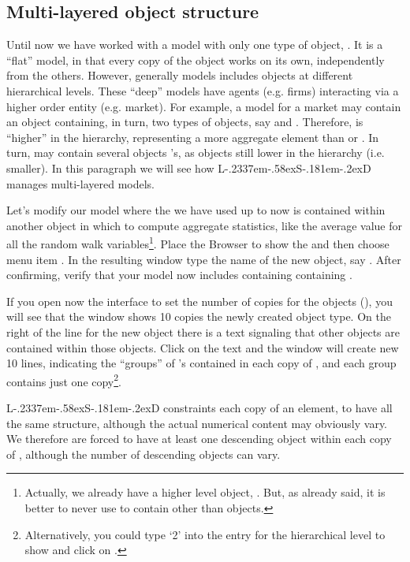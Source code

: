 \documentclass [11pt,a4paper] {book}
\def\LsD{{L\kern-.2337em\lower-.58ex\hbox{S}\kern-.181em\lower-.2ex\hbox{D}}\xspace}
\begin{document}
\subsection{Multi-layered object structure}

Until now we have worked with a model with only one type of object, . It is a
``flat'' model, in that every copy of the object works on its own, independently from the
others. However, generally models includes objects at different hierarchical levels.
These ``deep'' models have agents (e.g. firms) interacting via a higher order entity
(e.g. market). For example, a model for a market may contain an object 
containing, in turn, two types of objects, say  and . Therefore,
 is ``higher'' in the hierarchy, representing a more aggregate element than
 or . In turn,  may contain several objects
's, as objects still lower in the hierarchy (i.e. smaller). In this paragraph
we will see how \LsD manages multi-layered models.

Let's modify our model where the  we have used up to now is contained within
another object in which to compute aggregate statistics, like the average value for all
the random walk variables\footnote{Actually, we already have a higher level object,
. But, as already said, it is better to never use  to contain other
than objects.}. Place the Browser to show the  and then choose menu item
. In the resulting window type the name of the new object,
say . After confirming, verify that your model now includes
 containing  containing .

If you open now the interface to set the number of copies for the objects (), you will see that the window shows 10 copies 
the newly created  object type. On the right of the line for the new object there is a text signaling that other objects are contained within those objects. Click on the text and the window will create new 10 lines, indicating the ``groups'' of 's contained in each copy of , and each group contains just one copy\footnote{Alternatively, you could type `2' into the entry for the hierarchical level to show and click on \footnotesize.}.

\LsD constraints each copy of an element, to have all the same structure, although the actual numerical content may obviously vary. We therefore are forced to have at least one descending object  within each copy of , although the number of descending objects can vary.
\end{document}
